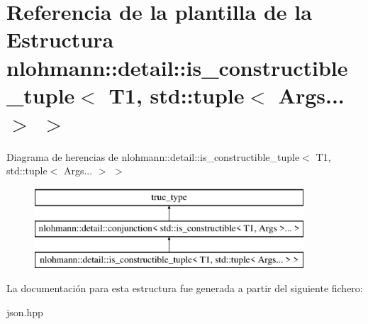 \hypertarget{structnlohmann_1_1detail_1_1is__constructible__tuple_3_01T1_00_01std_1_1tuple_3_01Args_8_8_8_01_4_01_4}{}\section{Referencia de la plantilla de la Estructura nlohmann\+:\+:detail\+:\+:is\+\_\+constructible\+\_\+tuple$<$ T1, std\+:\+:tuple$<$ Args... $>$ $>$}
\label{structnlohmann_1_1detail_1_1is__constructible__tuple_3_01T1_00_01std_1_1tuple_3_01Args_8_8_8_01_4_01_4}
Diagrama de herencias de nlohmann\+:\+:detail\+:\+:is\+\_\+constructible\+\_\+tuple$<$ T1, std\+:\+:tuple$<$ Args... $>$ $>$\begin{figure}[H]
\begin{center}
\leavevmode
\includegraphics[height=3.000000cm]{structnlohmann_1_1detail_1_1is__constructible__tuple_3_01T1_00_01std_1_1tuple_3_01Args_8_8_8_01_4_01_4}
\end{center}
\end{figure}


La documentación para esta estructura fue generada a partir del siguiente fichero\+:\begin{DoxyCompactItemize}
\item 
json.\+hpp\end{DoxyCompactItemize}

